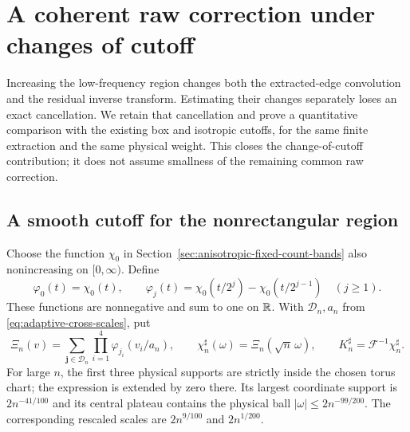 \section{A coherent raw correction under changes of cutoff}
\label{sec:coherent-raw-cutoff}
Increasing the low-frequency region changes both the extracted-edge
convolution and the residual inverse transform. Estimating their
changes separately loses an exact cancellation. We retain that
cancellation and prove a quantitative comparison with the existing
box and isotropic cutoffs, for the same finite extraction and the
same physical weight. This closes the change-of-cutoff contribution;
it does not assume smallness of the remaining common raw correction.

\subsection{A smooth cutoff for the nonrectangular region}
Choose the function $\chi_0$ in Section~\ref{sec:anisotropic-fixed-count-bands}
also nonincreasing on $[0,\infty)$. Define
\[
 \varphi_0(t)=\chi_0(t),\qquad
 \varphi_j(t)=\chi_0(t/2^j)-\chi_0(t/2^{j-1})\quad(j\ge1).
\]
These functions are nonnegative and sum to one on $\mathbb R$. With
$\mathcal D_n,a_n$ from \eqref{eq:adaptive-cross-scales}, put
\begin{equation}\label{eq:cross-smooth-cutoff}
 \Xi_n(v)=\sum_{\mathbf j\in\mathcal D_n}
                 \prod_{i=1}^4\varphi_{j_i}(v_i/a_n),\qquad
 \chi_n^\sharp(\omega)=\Xi_n(\sqrt n\,\omega),\qquad
 K_n^\sharp=\mathcal F^{-1}\chi_n^\sharp.
\end{equation}
For large $n$, the first three physical supports are strictly inside
the chosen torus chart; the expression is extended by zero there.
Its largest coordinate support is $2n^{-41/100}$ and its central
plateau contains the physical ball $|\omega|\le2n^{-99/200}$.
The corresponding rescaled scales are $2n^{9/100}$ and $2n^{1/200}$.


